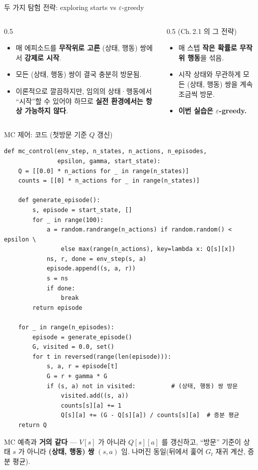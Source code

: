 \documentclass[aspectratio=169,11pt]{beamer}
\begin{document}
\begin{frame}{두 가지 탐험 전략: exploring starts vs
$\varepsilon$-greedy}
  \begin{columns}[T]
    \begin{column}{0.5\textwidth}
      \begin{itemize}
        \item 매 에피소드를 \textbf{무작위로 고른} (상태,
          행동) 쌍에서 \textbf{강제로 시작}.
        \item 모든 (상태, 행동) 쌍이 결국 충분히 방문됨.
        \item 이론적으로 깔끔하지만, 임의의 상태·행동에서
          ``시작''할 수 있어야 하므로 \textbf{실전 환경에서는
          항상 가능하지 않다}.
      \end{itemize}
    \end{column}
    \begin{column}{0.5\textwidth}
       (Ch.\,2.1 의 그 전략)
      \begin{itemize}
        \item 매 스텝 \textbf{작은 확률로 무작위 행동}을 섞음.
        \item 시작 상태와 무관하게 모든 (상태, 행동) 쌍을
          계속 조금씩 방문.
        \item \textbf{이번 실습은 $\varepsilon$-greedy.}
      \end{itemize}
    \end{column}
  \end{columns}
\end{frame}

\begin{frame}[fragile]{MC 제어: 코드 (첫방문 기준 $Q$ 갱신)}
\begin{lstlisting}
def mc_control(env_step, n_states, n_actions, n_episodes,
               epsilon, gamma, start_state):
    Q = [[0.0] * n_actions for _ in range(n_states)]
    counts = [[0] * n_actions for _ in range(n_states)]

    def generate_episode():
        s, episode = start_state, []
        for _ in range(100):
            a = random.randrange(n_actions) if random.random() < epsilon \
                else max(range(n_actions), key=lambda x: Q[s][x])
            ns, r, done = env_step(s, a)
            episode.append((s, a, r))
            s = ns
            if done:
                break
        return episode

    for _ in range(n_episodes):
        episode = generate_episode()
        G, visited = 0.0, set()
        for t in reversed(range(len(episode))):
            s, a, r = episode[t]
            G = r + gamma * G
            if (s, a) not in visited:          # (상태, 행동) 쌍 방문
                visited.add((s, a))
                counts[s][a] += 1
                Q[s][a] += (G - Q[s][a]) / counts[s][a]  # 증분 평균
    return Q
\end{lstlisting}
  {\footnotesize MC 예측과 \textbf{거의 같다} --- $V[s]$ 가
  아니라 $Q[s][a]$ 를 갱신하고, ``방문'' 기준이 상태 $s$ 가
  아니라 \textbf{(상태, 행동) 쌍} $(s,a)$ 임. 나머진 동일(뒤에서
  훑어 $G_t$ 재귀 계산, 증분 평균).}
\end{frame}
\end{document}
